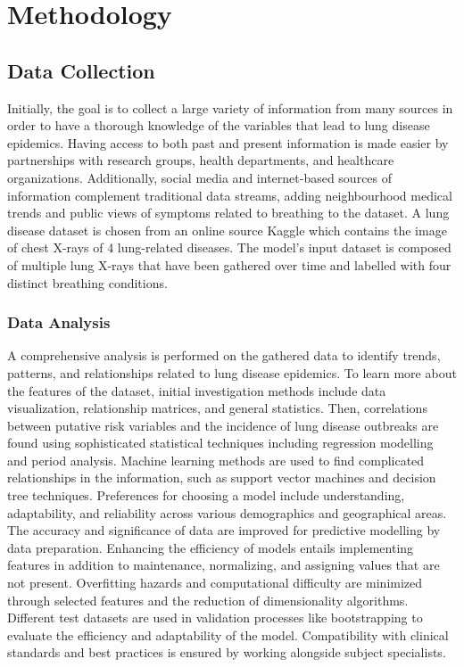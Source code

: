 \chapter{Methodology}
\label{ch:method} %


\section{Data Collection}
Initially, the goal is to collect a large variety of information from many sources in order to have a thorough knowledge of the variables that lead to lung disease epidemics. Having access to both past and present information is made easier by partnerships with research groups, health departments, and healthcare organizations. Additionally, social media and internet-based sources of information complement traditional data streams, adding neighbourhood medical trends and public views of symptoms related to breathing to the dataset. A lung disease dataset is chosen from an online source Kaggle which contains the image of chest X-rays of 4 lung-related diseases. The model's input dataset is composed of multiple lung X-rays that have been gathered over time and labelled with four distinct breathing conditions. 
\subsection{Data Analysis}
\label{subsec:se_chpters}
A comprehensive analysis is performed on the gathered data to identify trends, patterns, and relationships related to lung disease epidemics. To learn more about the features of the dataset, initial investigation methods include data visualization, relationship matrices, and general statistics. Then, correlations between putative risk variables and the incidence of lung disease outbreaks are found using sophisticated statistical techniques including regression modelling and period analysis. Machine learning methods are used to find complicated relationships in the information, such as support vector machines and decision tree techniques. Preferences for choosing a model include understanding, adaptability, and reliability across various demographics and geographical areas. The accuracy and significance of data are improved for predictive modelling by data preparation. Enhancing the efficiency of models entails implementing features in addition to maintenance, normalizing, and assigning values that are not present. Overfitting hazards and computational difficulty are minimized through selected features and the reduction of dimensionality algorithms. Different test datasets are used in validation processes like bootstrapping to evaluate the efficiency and adaptability of the model. Compatibility with clinical standards and best practices is ensured by working alongside subject specialists.


